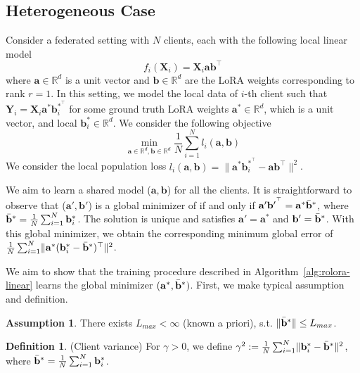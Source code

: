 \documentclass{article}
\theoremstyle{plain}
\theoremstyle{definition}
\newtheorem{definition}[theorem]{Definition}
\newtheorem{assumption}[theorem]{Assumption}
\theoremstyle{remark}
\begin{document}
\subsection{Heterogeneous Case} \label{rank-1-heter-clients}
Consider a federated setting with $N$ clients,  each with the following local linear model
\begin{equation}
    f_i(\mathbf{X}_i)=\mathbf{X}_i\mathbf{a}\mathbf{b}^\top \label{linear-model}
\end{equation}
where $\mathbf{a} \in \mathbb{R}^{d}$ is a unit vector and $\mathbf{b} \in \mathbb{R}^d$ are the LoRA weights corresponding to rank $r=1$. In this setting, we model the local data of $i$-th client such that $\mathbf{Y}_i=\mathbf{X}_i\mathbf{a}^*\mathbf{b}_i^{*^\top}$ for some ground truth LoRA weights $\mathbf{a}^* \in \mathbb{R}^{d}$, which is a unit vector, and local $\mathbf{b}_i^* \in \mathbb{R}^d$. We consider the following objective
\begin{equation}
    \min_{\mathbf{a}\in \mathbb{R}^{d},\mathbf{b}\in \mathbb{R}^d} \frac{1}{N}\sum_{i=1}^N l_i(\mathbf{a},\mathbf{b}) 
\end{equation}
We consider the local population loss $l_i(\mathbf{a},\mathbf{b}) = \lVert \mathbf{a}^*\mathbf{b}_i^{*^\top}- \mathbf{a}\mathbf{b}^\top\rVert^2$.

We aim to learn a shared model ($\mathbf{a},\mathbf{b}$) for all the clients. It is straightforward to observe that ($\mathbf{{a}}',\mathbf{b}'$) is a global minimizer of if and only if $\mathbf{{a}}'\mathbf{b'}^{^\top}=\mathbf{a}^*\Bar{\mathbf{b}}^*$, where $\Bar{\mathbf{b}}^*=\frac{1}{N}\sum_{i=1}^{N} \mathbf{b}_i^*$. The solution is unique and satisfies $\mathbf{a}'=\mathbf{a}^*$ and $\mathbf{b}'=\Bar{\mathbf{b}}^*$. With this global minimizer, we obtain the corresponding minimum global error of $\frac{1}{N} \sum_{i=1}^N \lVert \mathbf{a}^*(\mathbf{b}_i^*-\Bar{\mathbf{b}}^*)^\top \rVert^2$.


We aim to show that the training procedure described in Algorithm~\ref{alg:rolora-linear} learns the global minimizer $(\mathbf{a}^*,\Bar{\mathbf{b}}^*)$. First, we make typical assumption and definition.
\begin{assumption}  \label{client-norm}
     There exists $L_{max} < \infty$ (known a priori),  s.t. $\lVert \Bar{\mathbf{b}}^*\rVert \leq  L_{max}$.
\end{assumption} 


\begin{definition} (Client variance) \label{client-var}
    For $\gamma>0$, we define $\gamma^2 := \frac{1}{N} \sum_{i=1}^{N}\lVert \mathbf{b}_i^*-\Bar{\mathbf{b}}^*\rVert^2$, where $\Bar{\mathbf{b}}^* = \frac{1}{N} \sum_{i=1}^{N} \mathbf{b}_i^*$. 
\end{definition}
\end{document}
